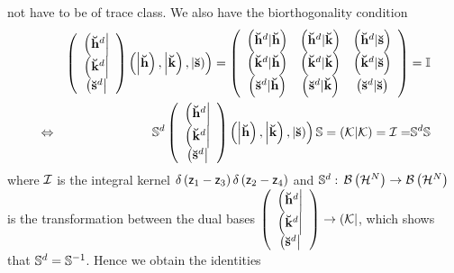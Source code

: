 not have to be of trace class. We also have the biorthogonality condition 
\begin{eqnarray}
&&\left( 
\begin{array}{c}
\left( {\bf \breve{h}}^{d}\right| \\ 
\left( {\bf \breve{k}}^{d}\right| \\ 
\left( {\bf \breve{s}}^{d}\right|%
\end{array}%
\right) \left( \left| {\bf \breve{h}}\right) ,\left| {\bf \breve{k}}\right)
,\left| {\bf \breve{s}}\right) \right) =\left( 
\begin{array}{ccc}
\left( {\bf \breve{h}}^{d}|{\bf \breve{h}}\right) & \left( {\bf \breve{h}}%
^{d}|{\bf \breve{k}}\right) & \left( {\bf \breve{h}}^{d}|{\bf \breve{s}}%
\right) \\ 
\left( {\bf \breve{k}}^{d}|{\bf \breve{h}}\right) & \left( {\bf \breve{k}}%
^{d}|{\bf \breve{k}}\right) & \left( {\bf \breve{k}}^{d}|{\bf \breve{s}}%
\right) \\ 
\left( {\bf \breve{s}}^{d}|{\bf \breve{h}}\right) & \left( {\bf \breve{s}}%
^{d}|{\bf \breve{k}}\right) & \left( {\bf \breve{s}}^{d}|{\bf \breve{s}}%
\right)%
\end{array}%
\right) ={\Bbb I} \\
&\Leftrightarrow &{\Bbb S}^{d}\left( 
\begin{array}{c}
\left( {\bf \breve{h}}^{d}\right| \\ 
\left( {\bf \breve{k}}^{d}\right| \\ 
\left( {\bf \breve{s}}^{d}\right|%
\end{array}%
\right) \left( \left| {\bf \breve{h}}\right) ,\left| {\bf \breve{k}}\right)
,\left| {\bf \breve{s}}\right) \right) {\Bbb S}=\left( {\cal K}|{\cal K}%
\right) ={\cal I=}{\Bbb S}^{d}{\Bbb S}
\end{eqnarray}%
where ${\cal I}$ is the integral kernel $\delta \left( {\sf z}_{1}-{\sf z}%
_{3}\right) \delta \left( {\sf z}_{2}-{\sf z}_{4}\right) $ and ${\Bbb S}%
^{d}: $ ${\cal B}\left( {\cal H}^{N}\right) \rightarrow {\cal B}\left( {\cal %
H}^{N}\right) $ is the transformation between the dual bases $\left( 
\begin{array}{c}
\left( {\bf \breve{h}}^{d}\right| \\ 
\left( {\bf \breve{k}}^{d}\right| \\ 
\left( {\bf \breve{s}}^{d}\right|%
\end{array}%
\right) \rightarrow \left( {\cal K}\right| $, which shows that ${\Bbb S}^{d}=%
{\Bbb S}^{-1}$. Hence we obtain the identities 
